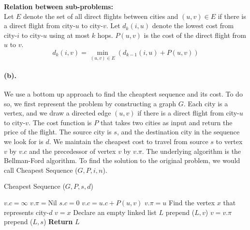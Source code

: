 \documentclass[12pt]{article}
\begin{document}
\pagebreak
\noindent \textbf{Relation between sub-problems:}\\
Let \(E\) denote the set of all direct flights between cities and \((u,v) \in E\) if there is a direct flight from city-\(u\) to city-\(v\). Let \(d_k(i,u)\) denote the lowest cost from city-\(i\) to city-\(u\) using at most \(k\) hops. \(P(u,v)\) is the cost of the direct flight from \(u\) to \(v\).
\begin{equation*}
     d_k(i,v) = \underset{(u,v) \in E}{\min} (d_{k-1}(i,u)+ P(u,v))
\end{equation*}
\paragraph{(b).} We use a bottom up approach to find the cheaptest sequence and its cost. To do so, we first represent the problem by constructing a graph \(G\). Each city is a vertex, and we draw a directed edge \((u,v)\) if there is a direct flight from city-\(u\) to city-\(v\). The cost function is \(P\) that takes two cities as input and return the price of the flight. The source city is \(s\), and the destination city in the sequence we look for is \(d\). We maintain the cheapest cost to travel from source \(s\) to vertex \(v\) by \(v.c\) and the precedessor of vertex \(v\) by \(v.\pi\). The underlying algorithm is the Bellman-Ford algorithm. To find the solution to the original problem, we would call Cheapest Sequence (\(G,P,i,n\)).
\begin{algorithm}[H]
     \caption{Cheapest Sequence (\(G, P, s, d\))} 
     \begin{algorithmic}[1]
               \State \(v.c = \infty\)
               \State \(v.\pi = \text{Nil}\)
          \EndFor
          \State \(s.c = 0\) 
                         \State \(v.c = u.c + P(u,v)\)
                         \State \(v.\pi = u\)
                    \EndIf
               \EndFor
          \EndFor
          \State Find the vertex \(x\) that represents city-\(d\)
          \State \(v = x\) 
          \State Declare an empty linked list \(L\) 
           
               \State prepend (\(L, v\))
               \State \(v = v.\pi\)
          \EndWhile
          \State prepend (\(L, s\))
          \State \textbf{Return} \(L\)
     \end{algorithmic}
\end{algorithm}
\end{document}

